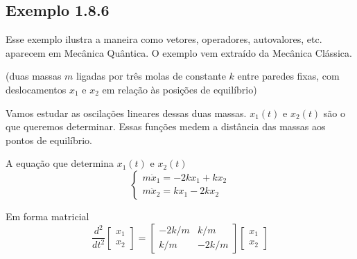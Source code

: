 
\subsection*{Exemplo 1.8.6}

Esse exemplo ilustra a maneira como vetores, operadores, autovalores, etc. aparecem em Mecânica Quântica. O exemplo vem extraído da Mecânica Clássica.

\begin{center}
(duas massas $m$ ligadas por três molas de constante $k$ entre paredes fixas, com deslocamentos $x_1$ e $x_2$ em relação às posições de equilíbrio)
\end{center}

Vamos estudar as oscilações lineares dessas duas massas. $x_1(t)$ e $x_2(t)$ são o que queremos determinar. Essas funções medem a distância das massas aos pontos de equilíbrio.

A equação que determina $x_1(t)$ e $x_2(t)$
\begin{equation}
    \begin{cases}
        m\ddot{x}_1 = -2kx_1 + kx_2 \\
        m\ddot{x}_2 = kx_1 - 2kx_2
    \end{cases}
\end{equation}

Em forma matricial
\begin{equation}
    \frac{d^2}{dt^2} \begin{bmatrix} x_1 \\ x_2 \end{bmatrix}
    =
    \begin{bmatrix} -2k/m & k/m \\ k/m & -2k/m \end{bmatrix}
    \begin{bmatrix} x_1 \\ x_2 \end{bmatrix}
\end{equation}

